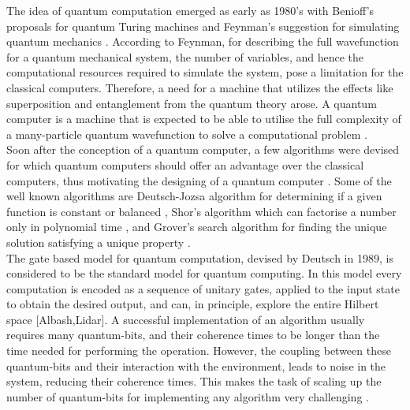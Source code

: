 \documentclass[main.tex]{subfiles}
\begin{document}
The idea of quantum computation emerged as early as 1980's with Benioff's proposals for quantum Turing machines and Feynman's suggestion for simulating quantum mechanics \cite{Albash_2018,benioff1982quantum,feynman1982simulating}. According to Feynman, for describing the full wavefunction for a quantum mechanical system, the number of variables, and hence the computational resources required to simulate the system, pose a limitation for the classical computers. Therefore, a need for a machine that utilizes the effects like superposition and entanglement from the quantum theory arose. A quantum computer is a machine that is expected to be able to utilise the full complexity of a  many-particle quantum wavefunction to solve a computational problem \cite{ladd2010quantum}.\\

Soon after the conception of a quantum computer, a few algorithms were devised for which quantum computers should offer an advantage over the classical computers, thus motivating the designing of a quantum computer \cite{nielsen2002quantum}.
Some of the well known algorithms are Deutsch-Jozsa algorithm for determining if a given function is constant or balanced \cite{deutsch1992rapid}, Shor's algorithm which can factorise a number only in polynomial time \cite{shor1994algorithms}, and Grover's search algorithm for finding the unique solution satisfying a unique property \cite{grover1996fast}.\\

The gate based model for quantum computation, devised by Deutsch in 1989, is considered to be the standard model for quantum computing. In this model every computation is encoded as a sequence of unitary gates, applied to the input state to obtain the desired output, and can, in principle, explore the entire Hilbert space [Albash,Lidar]. A successful implementation of an algorithm usually requires many quantum-bits, and their coherence times to be longer than the time needed for performing the operation. However, the coupling between these quantum-bits and their interaction with the environment, leads to noise in the system, reducing their coherence times. This makes the task of scaling up the number of quantum-bits for implementing any algorithm very challenging \cite{hauke2019perspectives}.\\
\end{document}
